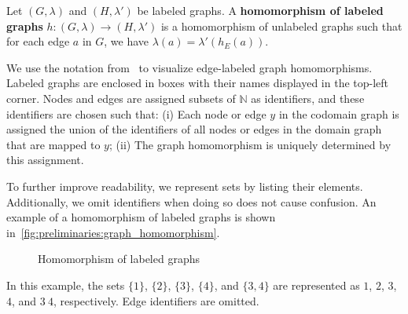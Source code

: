 \begin{definition}
    \label{def:graph:homomorphism}
    Let \( (G,\lambda) \) and \( (H,\lambda') \) be labeled graphs. A \textbf{homomorphism of labeled graphs} $h:(G,\lambda) \rightarrow (H,\lambda')$ is a homomorphism of unlabeled graphs such that for each edge \( a \) in \( G \), we have \( \lambda (a) = \lambda' (h_E (a)) \).
\end{definition}


\begin{notation}
    \label{notation:graph_homomorphism}
    We use the notation from~\cite[Notation 1]{overbeek2023apbpotutorial} to visualize edge-labeled graph homomorphisms. Labeled graphs are enclosed in boxes with their names displayed in the top-left corner. Nodes and edges are assigned subsets of \(\mathbb{N}\) as identifiers, and these identifiers are chosen such that: (i) Each node or edge \( y \) in the codomain graph is assigned the union of the identifiers of all nodes or edges in the domain graph that are mapped to \( y \); (ii) The graph homomorphism is uniquely determined by this assignment.
    
    \noindent To further improve readability, we represent sets by listing their elements. Additionally, we omit identifiers when doing so does not cause confusion. An example of a homomorphism of labeled graphs is shown in~\autoref{fig:preliminaries:graph_homomorphism}.
    
    \begin{figure}[!htbp]
        \centering
    \caption{Homomorphism of labeled graphs}
    \label{fig:preliminaries:graph_homomorphism}
    \end{figure}
    In this example, the sets \(\{1\}\), \(\{2\}\), \(\{3\}\), \(\{4\}\), and \(\{3,4\}\) are represented as \(1\), \(2\), \(3\), \(4\), and \(3\ 4\), respectively. Edge identifiers are omitted.
\end{notation} 


